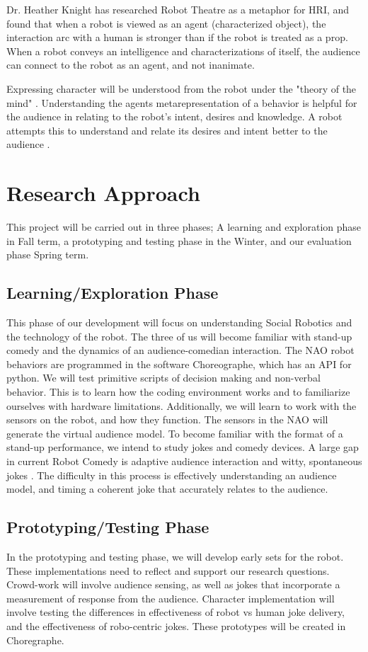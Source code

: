 \documentclass[onecolumn, draftclsnofoot,10pt, compsoc]{IEEEtran}
\begin{document}
Dr. Heather Knight has researched Robot Theatre as a metaphor for HRI, and found that when a robot is viewed as an agent (characterized object), the interaction arc with a human is stronger than if the robot is treated as a prop. When a robot conveys an intelligence and characterizations of itself, the audience can connect to the robot as an agent, and not inanimate.

Expressing character will be understood from the robot under the "theory of the mind" \cite{leslie}. Understanding the agents metarepresentation of a behavior is helpful for the audience in relating to the robot's intent, desires and knowledge. A robot attempts this to understand and relate its desires and intent better to the audience \cite{theoryOfMindRobots}.

\section{Research Approach}
This project will be carried out in three phases; A learning and exploration phase in Fall term, a prototyping and testing phase in the Winter, and our evaluation phase Spring term.

\subsection{Learning/Exploration Phase}
This phase of our development will focus on understanding Social Robotics and the technology of the robot. The three of us will become familiar with stand-up comedy and the dynamics of an audience-comedian interaction. The NAO robot behaviors are programmed in the software Choreographe, which has an API for python. We will test primitive scripts of decision making and non-verbal behavior. This is to learn how the coding environment works and to familiarize ourselves with hardware limitations. Additionally, we will learn to work with the sensors on the robot, and how they function. The sensors in the NAO will generate the virtual audience model. To become familiar with the format of a stand-up performance, we intend to study jokes and comedy devices. A large gap in current Robot Comedy is adaptive audience interaction and witty, spontaneous jokes \cite{KatevasRobot:2014}. The difficulty in this process is effectively understanding an audience model, and timing a coherent joke that accurately relates to the audience.

\subsection{Prototyping/Testing Phase}
In the prototyping and testing phase, we will develop early sets for the robot. These implementations need to reflect and support our research questions. Crowd-work will involve audience sensing, as well as jokes that incorporate a measurement of response from the audience. Character implementation will involve testing the differences in effectiveness of robot vs human joke delivery, and the effectiveness of robo-centric jokes. These prototypes will be created in Choregraphe.
\end{document}
